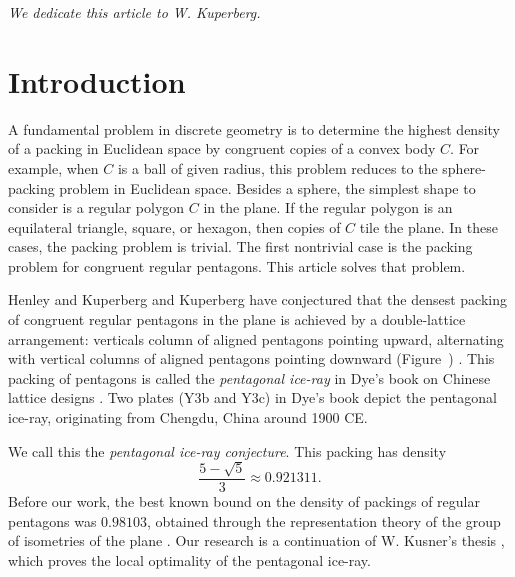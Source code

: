 \def\penp#1#2{%
\draw[red] (#1) + (#2:1cm) -- + (#2+72:1cm) -- 
  +(#2+144:1cm) -- +(#2+216:1cm) -- + (#2+288:1cm) -- cycle
}


\def\threepent#1#2#3#4#5#6#7#8#9{%
\pen{#1}{#2}{#3};
\pen{#4}{#5}{#6};
\pen{#7}{#8}{#9};
\draw[blue] (#1,#2) -- (#4,#5) -- (#7,#8) -- cycle
}

\def\threepentnoD#1#2#3#4#5#6#7#8#9{%
\pen{#1}{#2}{#3};
\pen{#4}{#5}{#6};
\pen{#7}{#8}{#9}
}

\def\blankfig#1{\tikzfig{#1}{Insert graphic}
{
[scale=1]
\draw(0,) circle(1cm);
}}



\centerline{\it We dedicate this article to W. Kuperberg.}

\section{Introduction}\label{sec:intro} 

A fundamental problem in discrete geometry is to determine the highest
density of a packing in Euclidean space by congruent copies of a
convex body $C$.  For example, when $C$ is a ball of given radius,
this problem reduces to the sphere-packing problem in Euclidean space.
Besides a sphere, the simplest shape to consider is a regular polygon
$C$ in the plane.  If the regular polygon is an equilateral
triangle, square, or hexagon, then copies of $C$ tile the plane.  In
these cases, the packing problem is trivial.  The first nontrivial
case is the packing problem for congruent regular pentagons.  This
article solves that problem.

Henley and Kuperberg and Kuperberg have conjectured that the densest
packing of congruent regular pentagons in the plane is achieved by a
double-lattice arrangement: verticals column of aligned pentagons
pointing upward, alternating with vertical columns of aligned
pentagons pointing downward (Figure~)
\cite{Kup} \cite[p.801]{henley}.  This packing of pentagons is called
the {\it pentagonal ice-ray} in Dye's book on Chinese lattice designs
\cite{dye}.  Two plates (Y3b and Y3c) in Dye's book depict the
pentagonal ice-ray, originating from Chengdu, China around 1900 CE.

 We call this the {\it pentagonal ice-ray  conjecture}.
This packing has density
\[
\frac{5 - \sqrt{5}}3 \approx 0.921311.
\] %
Before our work, the best known bound on the density of packings of
regular pentagons was $0.98103$, obtained through the representation
theory of the group of isometries of the plane \cite{Val}.  Our
research is a continuation of W. Kusner's thesis \cite{Kus}, which
proves the local optimality of the pentagonal ice-ray.


